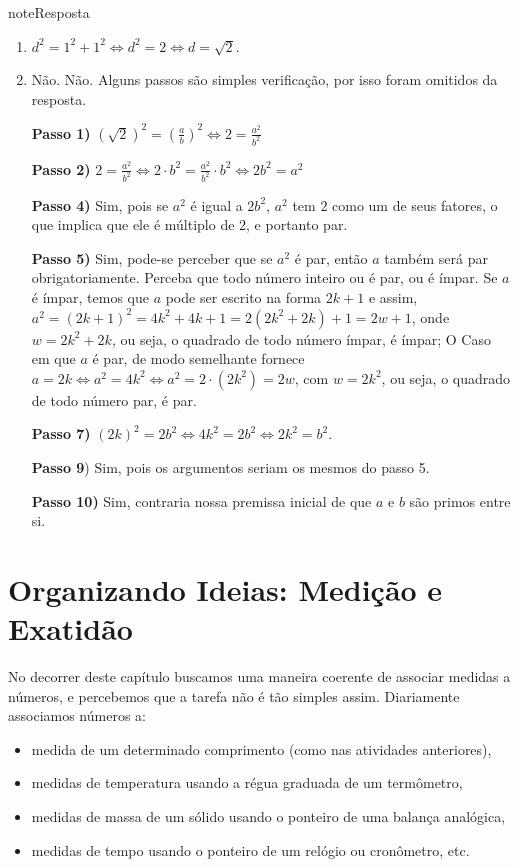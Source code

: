 \begin{sphinxadmonition}{note}{Resposta}
\begin{enumerate}
\item {} 
\(d^2 = 1^2 + 1^2  \Leftrightarrow d^2=2 \Leftrightarrow d=\sqrt{2}\).

\item {} 
Não. Não. Alguns passos são simples verificação, por isso foram omitidos da resposta.

\textbf{Passo 1)} \((\sqrt{2})^2=(\frac{a}{b})^2\Leftrightarrow 2=\frac{a^2}{b^2}\)

\textbf{Passo 2)} \(2=\frac{a^2}{b^2} \Leftrightarrow 2\cdot b^2 = \frac{a^2}{b^2}\cdot b^2 \Leftrightarrow 2b^2=a^2\)

\textbf{Passo 4)} Sim, pois se \(a^2\) é igual a \(2b^2\), \(a^2\) tem \(2\) como um de seus fatores, o que implica que ele é múltiplo de \(2\), e portanto par.

\textbf{Passo 5)} Sim, pode-se perceber que se \(a^2\) é par, então \(a\) também será par obrigatoriamente. Perceba que todo número inteiro ou é par, ou é ímpar. Se \(a\) é ímpar, temos que \(a\) pode ser escrito na forma \(2k+1\) e assim, \(a^2 = (2k+1)^2 = 4k^2 + 4k + 1 = 2(2k^2 + 2k) + 1 = 2w + 1\), onde \(w= 2k^2+2k\), ou seja, o quadrado de todo número ímpar, é ímpar; O Caso em que \(a\) é par, de modo semelhante fornece \(a = 2k \Leftrightarrow a^2 = 4k^2 \Leftrightarrow a^2 = 2 \cdot (2k^2) = 2w\), com \(w=2k^2\), ou seja, o quadrado de todo número par, é par.

\textbf{Passo 7)} \((2k)^2 = 2b^2 \Leftrightarrow 4k^2 = 2b^2 \Leftrightarrow 2k^2=b^2\).

\textbf{Passo 9}) Sim, pois os argumentos seriam os mesmos do passo 5.

\textbf{Passo 10)} Sim, contraria nossa premissa inicial de que \(a\) e \(b\) são primos entre si.

\end{enumerate}
\end{sphinxadmonition}


\section{Organizando Ideias: Medição e Exatidão}
\label{\detokenize{NO103-5:organizando-ideias-medicao-e-exatidao}}
No decorrer deste capítulo buscamos uma maneira coerente de associar medidas a números, e percebemos que a tarefa não é tão simples assim. Diariamente associamos números a:
\begin{itemize}
\item {} 
medida de um determinado comprimento (como nas atividades anteriores),

\item {} 
medidas de temperatura usando a régua graduada de um termômetro,

\item {} 
medidas de massa de um sólido usando o ponteiro de uma balança analógica,

\item {} 
medidas de tempo usando o ponteiro de um relógio ou cronômetro, etc.

\end{itemize}

